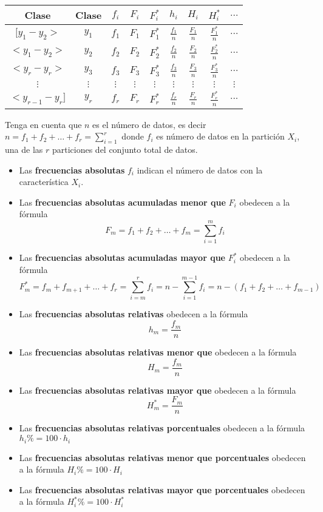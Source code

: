 \documentclass[10pt,]{krantz}
\theoremstyle{definition}
\theoremstyle{definition}
\theoremstyle{definition}
\theoremstyle{remark}
\begin{document}
\begin{longtable}[]{@{}ccccccccc@{}}
\toprule
Clase & Clase & \(f_i\) & \(F_i\) & \(F_i^*\) & \(h_i\) & \(H_i\) & \(H_i^*\) & \(\ldots\)\tabularnewline
\midrule
\endhead
\([y_1-y_2>\) & \(y_1\) & \(f_1\) & \(F_1\) & \(F_1^*\) & \(\frac{f_1}{n}\) & \(\frac{F_1}{n}\) & \(\frac{F_1^*}{n}\) & \(\ldots\)\tabularnewline
\(<y_1-y_2>\) & \(y_2\) & \(f_2\) & \(F_2\) & \(F_2^*\) & \(\frac{f_2}{n}\) & \(\frac{F_2}{n}\) & \(\frac{F_2^*}{n}\) & \(\ldots\)\tabularnewline
\(<y_{r}-y_r>\) & \(y_3\) & \(f_3\) & \(F_3\) & \(F_3^*\) & \(\frac{f_3}{n}\) & \(\frac{F_3}{n}\) & \(\frac{F_3^*}{n}\) & \(\ldots\)\tabularnewline
\(\vdots\) & \(\vdots\) & \(\vdots\) & \(\vdots\) & \(\vdots\) & \(\vdots\) & \(\vdots\) & \(\vdots\) & \(\vdots\)\tabularnewline
\(<y_{r-1}-y_r]\) & \(y_r\) & \(f_r\) & \(F_r\) & \(F_r^*\) & \(\frac{f_r}{n}\) & \(\frac{F_r}{n}\) & \(\frac{F_r^*}{n}\) & \(...\)\tabularnewline
\bottomrule
\end{longtable}

Tenga en cuenta que \(n\) es el número de datos, es decir \(n=f_1+f_2+\ldots+f_r=\sum_{i=1}^r\) donde \(f_i\) es número de datos en la partición \(X_i\), una de las \(r\) particiones del conjunto total de datos.

\begin{itemize}
\item
  Las \textbf{frecuencias absolutas} \(f_i\) indican el número de datos con la característica \(X_i\).
\item
  Las \textbf{frecuencias absolutas acumuladas menor que} \(F_i\) obedecen a la fórmula
  \[F_m=f_1+f_2+\ldots+f_m=\sum_{i=1}^mf_i\]
\item
  Las \textbf{frecuencias absolutas acumuladas mayor que} \(F_i^*\) obedecen a la fórmula
  \[F_m^*=f_m+f_{m+1}+\ldots+f_r=\sum_{i=m}^rf_i=n-\sum_{i=1}^{m-1}f_i=n-\left(f_1+f_{2}+\ldots+f_{m-1}\right)\]
\item
  Las \textbf{frecuencias absolutas relativas} obedecen a la fórmula
  \[h_m=\frac{f_m}{n}\]
\item
  Las \textbf{frecuencias absolutas relativas menor que} obedecen a la fórmula
  \[H_m=\frac{f_m}{n}\]
\item
  Las \textbf{frecuencias absolutas relativas mayor que} obedecen a la fórmula
  \[H_m^*=\frac{F_m}{n}\]
\item
  Las \textbf{frecuencias absolutas relativas porcentuales} obedecen a la fórmula
  \(h_i\%=100\cdot h_i\)
\item
  Las \textbf{frecuencias absolutas relativas menor que porcentuales} obedecen a la fórmula
  \(H_i\%=100\cdot H_i\)
\item
  Las \textbf{frecuencias absolutas relativas mayor que porcentuales} obedecen a la fórmula
  \(H_i^*\%=100\cdot H_i^*\)
\end{itemize}
\end{document}
